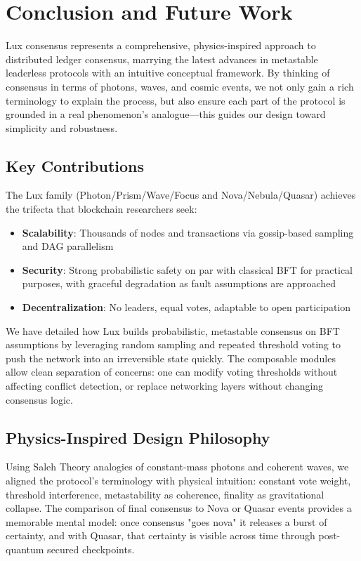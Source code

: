 \section{Conclusion and Future Work}

Lux consensus represents a comprehensive, physics-inspired approach to distributed ledger consensus, marrying the latest advances in metastable leaderless protocols with an intuitive conceptual framework. By thinking of consensus in terms of photons, waves, and cosmic events, we not only gain a rich terminology to explain the process, but also ensure each part of the protocol is grounded in a real phenomenon's analogue—this guides our design toward simplicity and robustness.

\subsection{Key Contributions}

The Lux family (Photon/Prism/Wave/Focus and Nova/Nebula/Quasar) achieves the trifecta that blockchain researchers seek:

\begin{itemize}
\item \textbf{Scalability}: Thousands of nodes and transactions via gossip-based sampling and DAG parallelism
\item \textbf{Security}: Strong probabilistic safety on par with classical BFT for practical purposes, with graceful degradation as fault assumptions are approached  
\item \textbf{Decentralization}: No leaders, equal votes, adaptable to open participation
\end{itemize}

We have detailed how Lux builds probabilistic, metastable consensus on BFT assumptions by leveraging random sampling and repeated threshold voting to push the network into an irreversible state quickly. The composable modules allow clean separation of concerns: one can modify voting thresholds without affecting conflict detection, or replace networking layers without changing consensus logic.

\subsection{Physics-Inspired Design Philosophy}

Using Saleh Theory analogies of constant-mass photons and coherent waves, we aligned the protocol's terminology with physical intuition: constant vote weight, threshold interference, metastability as coherence, finality as gravitational collapse. The comparison of final consensus to Nova or Quasar events provides a memorable mental model: once consensus "goes nova" it releases a burst of certainty, and with Quasar, that certainty is visible across time through post-quantum secured checkpoints.

